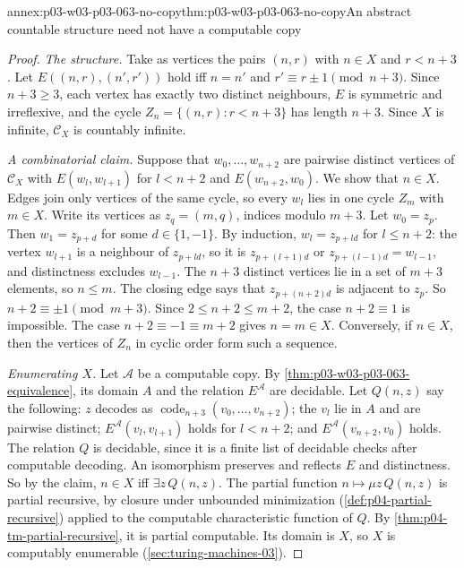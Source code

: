 \begin{annexitem}{annex:p03-w03-p03-063-no-copy}{thm:p03-w03-p03-063-no-copy}{An abstract countable structure need not have a computable copy}
\begin{proof}
\emph{The structure.}  Take as vertices the pairs \((n,r)\) with \(n\in X\)
and \(r<n+3\).  Let \(E((n,r),(n',r'))\) hold iff \(n=n'\) and
\(r'\equiv r\pm1\pmod{n+3}\).  Since \(n+3\geq3\), each vertex has exactly
two distinct neighbours, \(E\) is symmetric and irreflexive, and the cycle
\(Z_n=\{(n,r):r<n+3\}\) has length \(n+3\).  Since \(X\) is infinite,
\(\mathcal C_X\) is countably infinite.

\emph{A combinatorial claim.}  Suppose that \(w_0,\ldots,w_{n+2}\) are
pairwise distinct vertices of \(\mathcal C_X\) with \(E(w_l,w_{l+1})\) for
\(l<n+2\) and \(E(w_{n+2},w_0)\).  We show that \(n\in X\).  Edges join only
vertices of the same cycle, so every \(w_l\) lies in one cycle \(Z_m\) with
\(m\in X\).  Write its vertices as \(z_q=(m,q)\), indices modulo \(m+3\).
Let \(w_0=z_p\).  Then \(w_1=z_{p+d}\) for some \(d\in\{1,-1\}\).  By
induction, \(w_l=z_{p+ld}\) for \(l\leq n+2\): the vertex \(w_{l+1}\) is a
neighbour of \(z_{p+ld}\), so it is \(z_{p+(l+1)d}\) or
\(z_{p+(l-1)d}=w_{l-1}\), and distinctness excludes \(w_{l-1}\).  The
\(n+3\) distinct vertices lie in a set of \(m+3\) elements, so \(n\leq m\).
The closing edge says that \(z_{p+(n+2)d}\) is adjacent to \(z_p\).  So
\(n+2\equiv\pm1\pmod{m+3}\).  Since \(2\leq n+2\leq m+2\), the case
\(n+2\equiv1\) is impossible.  The case \(n+2\equiv-1\equiv m+2\) gives
\(n=m\in X\).  Conversely, if \(n\in X\), then the vertices of \(Z_n\) in
cyclic order form such a sequence.

\emph{Enumerating \(X\).}  Let \(\mathcal A\) be a computable copy.  By
\cref{thm:p03-w03-p03-063-equivalence}, its domain \(A\) and the relation
\(E^{\mathcal A}\) are decidable.  Let \(Q(n,z)\) say the following: \(z\)
decodes as \(\operatorname{code}_{n+3}(v_0,\ldots,v_{n+2})\); the \(v_l\) lie
in \(A\) and are pairwise distinct; \(E^{\mathcal A}(v_l,v_{l+1})\) holds for
\(l<n+2\); and \(E^{\mathcal A}(v_{n+2},v_0)\) holds.  The relation \(Q\) is
decidable, since it is a finite list of decidable checks after computable
decoding.  An isomorphism preserves and reflects \(E\) and distinctness.  So
by the claim, \(n\in X\) iff \(\exists z\,Q(n,z)\).  The partial function
\(n\mapsto\mu z\,Q(n,z)\) is partial recursive, by closure under unbounded
minimization (\cref{def:p04-partial-recursive}) applied to the computable
characteristic function of \(Q\).  By \cref{thm:p04-tm-partial-recursive}, it
is partial computable.  Its domain is \(X\), so \(X\) is computably
enumerable (\cref{sec:turing-machines-03}).


\end{proof}
\end{annexitem}
